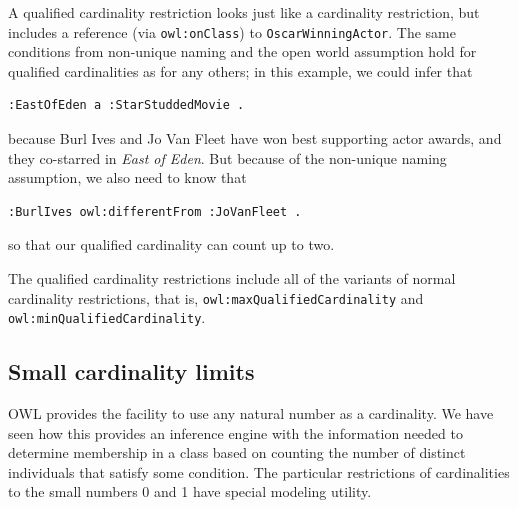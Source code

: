 A
qualified cardinality restriction looks just like a cardinality
restriction, but includes a reference (via \texttt{owl:onClass}) to
\texttt{OscarWinningActor}. The same conditions from non-unique naming and the open world
assumption hold for qualified cardinalities as for any others; in this
example, we could infer that

\begin{lstlisting}
:EastOfEden a :StarStuddedMovie .
\end{lstlisting}

because Burl Ives and Jo Van Fleet have won best supporting actor awards, and they 
co-starred in \emph{East of Eden}.  But because of the non-unique naming assumption,
we also need to know that

\begin{lstlisting}
:BurlIves owl:differentFrom :JoVanFleet . 
\end{lstlisting}

so that our qualified cardinality can count up to two. 

The qualified cardinality
restrictions include all of the variants of normal cardinality
restrictions, that is, \texttt{owl:maxQualifiedCardinality} and
\texttt{owl:minQualifiedCardinality}.

\subsection{Small cardinality limits}

OWL provides the facility to use any natural number as a cardinality. We
have seen how this provides an inference engine with the information
needed to determine membership in a class based on counting the number
of distinct individuals that satisfy some condition. The particular
restrictions of cardinalities to the small numbers 0 and 1 have
special modeling utility.

